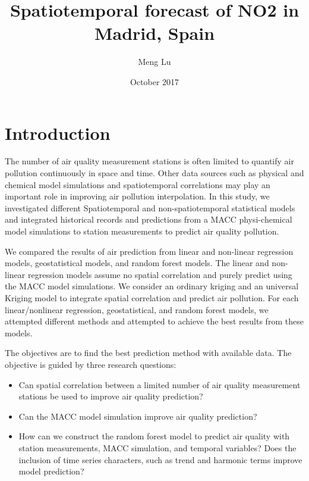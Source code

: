\documentclass{article}
\title{Spatiotemporal forecast of NO2 in Madrid, Spain}
\author{Meng Lu}
\date{October 2017}
\begin{document}
\maketitle


\section{Introduction}

The number of air quality measurement stations is often limited to quantify air pollution continuously in space and time. Other data sources such as physical and chemical model simulations and spatiotemporal correlations may play an important role in improving air pollution interpolation. In this study, we investigated different Spatiotemporal and non-spatiotemporal statistical models and integrated historical records and predictions from a MACC physi-chemical model simulations to station measurements to predict air quality pollution.

We compared the results of air prediction from linear and non-linear regression models, geostatistical models, and random forest models. The linear and non-linear regression models assume no spatial correlation and purely predict using the MACC model simulations. We consider an ordinary kriging and an universal Kriging model to integrate spatial correlation and predict air pollution. For each linear/nonlinear regression, geostatistical, and random forest models, we attempted different methods and attempted to achieve the best results from these models.    

The objectives are to find the best prediction method with available data. The objective is guided by three research questions:

\begin{itemize}
\item Can spatial correlation between a limited number of air quality measurement stations be used to improve air quality prediction? 

\item Can the MACC model simulation improve air quality prediction?

\item How can we construct the random forest model to predict air quality with station measurements, MACC simulation, and temporal variables? Does the inclusion of time series characters, such as trend and harmonic terms improve model prediction? 

\end{itemize}
\end{document}
